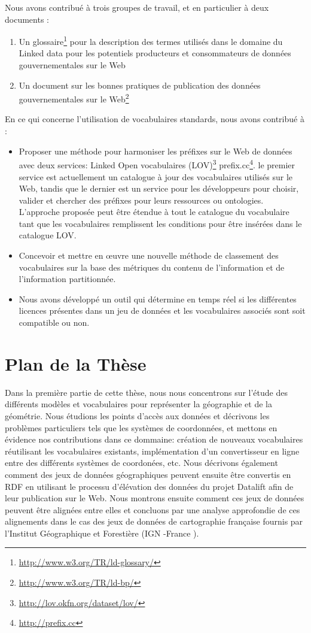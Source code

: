 \documentclass[a4paper,11pt,twoside]{report}
\begin{document}
Nous avons contribué à trois groupes de travail, et en particulier à deux documents :
\begin{enumerate}
 \item Un glossaire\footnote{\url{http://www.w3.org/TR/ld-glossary/}} pour la description des termes utilisés dans le domaine du Linked data pour les potentiels producteurs et consommateurs de données gouvernementales sur le Web
 \item Un document sur les bonnes pratiques de publication des données gouvernementales sur le Web\footnote{\url{http://www.w3.org/TR/ld-bp/}}
\end{enumerate}

En ce qui concerne l'utilisation de vocabulaires standards, nous avons contribué à :
\begin{itemize}
 \item Proposer une méthode pour harmoniser les préfixes sur le Web de données avec deux services: Linked Open vocabulaires (LOV)\footnote{\url{http://lov.okfn.org/dataset/lov/}} prefix.cc\footnote{\url{http://prefix.cc}}. le premier service est actuellement un catalogue à jour des vocabulaires utilisés sur le Web, tandis que le dernier est un service pour les développeurs pour choisir, valider et chercher des préfixes pour leurs ressources ou ontologies. L'approche proposée peut être étendue à tout le catalogue du vocabulaire tant que les vocabulaires remplissent les conditions pour être insérées dans le catalogue LOV.
 \item Concevoir et mettre en œuvre une nouvelle méthode de classement des vocabulaires sur la base des métriques du contenu de l'information et de l'information partitionnée.
 \item Nous avons développé un outil qui détermine en temps réel si les différentes licences présentes dans un jeu de données et les vocabulaires associés sont soit compatible ou non.
\end{itemize}

\chapter*{Plan de la Thèse}
\label{sec:thesis-structure}
Dans la première partie de cette thèse, nous nous concentrons sur l'étude des différents modèles et vocabulaires pour représenter la géographie et de la géométrie. Nous étudions les points d'accès aux données et décrivons les problèmes particuliers tels que les systèmes de coordonnées, et mettons en évidence nos contributions dans ce dommaine: création de nouveaux vocabulaires réutilisant les vocabulaires existants, implémentation d'un convertisseur en ligne entre des différents systèmes de coordonées, etc. Nous décrivons également comment des jeux de données géographiques peuvent ensuite être convertis en RDF en utilisant le processu d'élévation des données du projet Datalift afin de leur publication sur le Web. Nous montrons ensuite comment ces jeux de données peuvent être alignées entre elles et concluons par une analyse approfondie de ces alignements dans le cas des jeux de données de cartographie française fournis par l'Institut Géographique et Forestière (IGN -France ).
\end{document}
